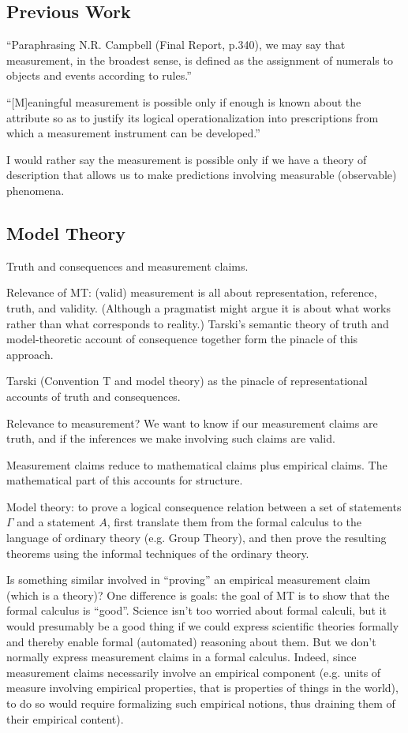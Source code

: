 \documentclass[11pt,twoside]{article}
\begin{document}
\subsection{Previous Work}

``Paraphrasing N.R. Campbell (Final Report, p.340), we may say that
measurement, in the broadest sense, is defined as the assignment of
numerals to objects and events according to rules.''
\parencite[677]{stevens_theory_1946}


``[M]eaningful measurement is possible only if enough is known about
the attribute so as to justify its logical operationalization into
prescriptions from which a measurement instrument can be developed.''
\parencite[787]{sijtsma_psychological_2012}

I would rather say the measurement is possible only if we have a
theory of description that allows us to make predictions involving
measurable (observable) phenomena.

\subsection{Model Theory}

Truth and consequences and measurement claims.

Relevance of MT: (valid) measurement is all about representation,
reference, truth, and validity.  (Although a pragmatist might argue it
is about what works rather than what corresponds to reality.)
Tarski's semantic theory of truth and model-theoretic account of
consequence together form the pinacle of this approach.

Tarski (Convention T and model theory) as the pinacle of
representational accounts of truth and consequences.

Relevance to measurement?  We want to know if our measurement claims
are truth, and if the inferences we make involving such claims are
valid.

Measurement claims reduce to mathematical claims plus empirical
claims.  The mathematical part of this accounts for structure.

Model theory: to prove a logical consequence relation between a set of
statements $\Gamma$ and a statement $A$, first translate them from the
formal calculus to the language of ordinary theory (e.g. Group
Theory), and then prove the resulting theorems using the informal
techniques of the ordinary theory.

Is something similar involved in ``proving'' an empirical measurement
claim (which is a theory)?  One difference is goals: the goal of MT is
to show that the formal calculus is ``good''.  Science isn't too
worried about formal calculi, but it would presumably be a good thing
if we could express scientific theories formally and thereby enable
formal (automated) reasoning about them.  But we don't normally
express measurement claims in a formal calculus.  Indeed, since
measurement claims necessarily involve an empirical component
(e.g. units of measure involving empirical properties, that is
properties of things in the world), to do so would require formalizing
such empirical notions, thus draining them of their empirical
content).
\end{document}
